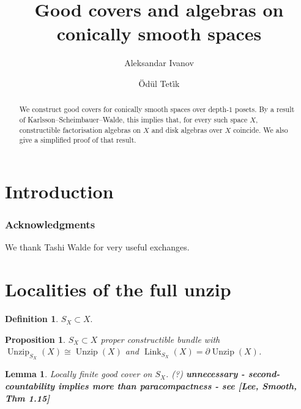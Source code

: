 \documentclass[]{amsart}
\title{{Good covers and algebras on conically smooth spaces}}
\author{Aleksandar Ivanov}
\author{\"Od\"ul Tet\.{i}k}
\date{}
\DeclareMathOperator{\Unzip}{Unzip}
\DeclareMathOperator{\Link}{Link}
\numberwithin{equation}{section}
\theoremstyle{definition}
\newtheorem{definition}[equation]{Definition}%
\theoremstyle{remark}
\theoremstyle{plain}
\newtheorem{proposition}[equation]{Proposition}
\newtheorem{lemma}[equation]{Lemma}
\begin{document}
\maketitle

\begin{abstract}
    We construct good covers for conically smooth spaces {\color{MidnightBlue} over depth-$1$ posets}. By a result of Karlsson--Scheimbauer--Walde, this implies that, for every such space $X$, constructible factorisation algebras on $X$ and disk algebras over $X$ coincide. We also give a simplified proof of that result.
\end{abstract}



\tableofcontents

\section{Introduction}

\subsubsection*{Acknowledgments} We thank Tashi Walde for very useful exchanges.

\section{Localities of the full unzip}


\begin{definition}
    $S_X\subset X$.
\end{definition}

\begin{proposition}\label{7GBVGBA}
    $S_X\subset X$ proper constructible bundle with $\Unzip_{S_X}(X)\cong\Unzip(X)$ and $\Link_{S_X}(X)=\partial\Unzip(X)$.
\end{proposition}


\begin{lemma}\label{DNFREG0}
    {\color{gray}Locally finite good cover on $S_X$. (?)} {\bf unnecessary - second-countability implies more than paracompactness - see [Lee, Smooth, Thm 1.15]}
\end{lemma}
\end{document}

